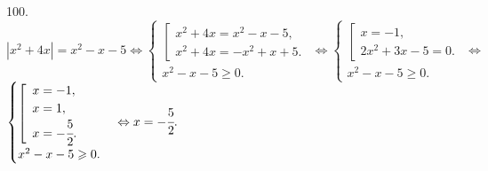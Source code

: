 100. $|x^2+4x|=x^2-x-5\Leftrightarrow \begin{cases}\left[\begin{array}{l} x^2+4x=x^2-x-5,\\ x^2+4x=-x^2+x+5.\end{array}\right.\\x^2-x-5\geqslant0.\end{cases}
\Leftrightarrow \begin{cases}\left[\begin{array}{l} x=-1,\\ 2x^2+3x-5=0.\end{array}\right.\\x^2-x-5\geqslant0.\end{cases}
\Leftrightarrow$\\$ \begin{cases}\left[\begin{array}{l} x=-1,\\ x=1,\\ x=-\cfrac{5}{2}.\end{array}\right.\\x^2-x-5\geqslant0.\end{cases}
\Leftrightarrow x=-\cfrac{5}{2}.$\\
